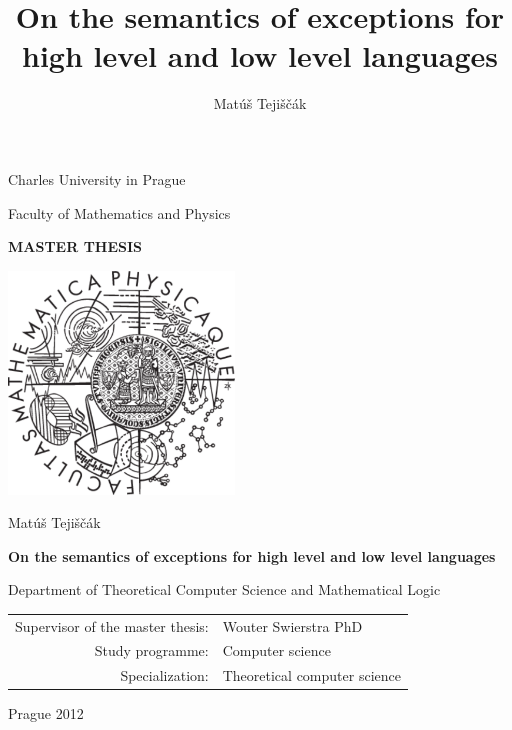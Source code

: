 \documentclass[12pt,a4paper,twoside,openright]{book}
\title{On the semantics of exceptions for high level and low level languages}
\author{Matúš Tejiščák}
\begin{document}
\frontmatter



\pagestyle{empty}
\begin{center}

\large

Charles University in Prague

\medskip

Faculty of Mathematics and Physics

\vfill

{\bf\Large MASTER THESIS}

\vfill

\centerline{\mbox{\includegraphics[width=60mm]{figures/logo}}}

\vfill
\vspace{5mm}

{\LARGE Matúš Tejiščák}

\vspace{15mm}

{\LARGE\bfseries On the semantics of exceptions for high level and low level languages}

\vfill

Department of Theoretical Computer Science and Mathematical Logic

\vfill

\begin{tabular}{rl}

Supervisor of the master thesis: & Wouter Swierstra PhD\\
\noalign{\vspace{2mm}}
Study programme: & Computer science \\
\noalign{\vspace{2mm}}
Specialization: & Theoretical computer science \\
\end{tabular}

\vfill

Prague 2012

\end{center}
\end{document}
